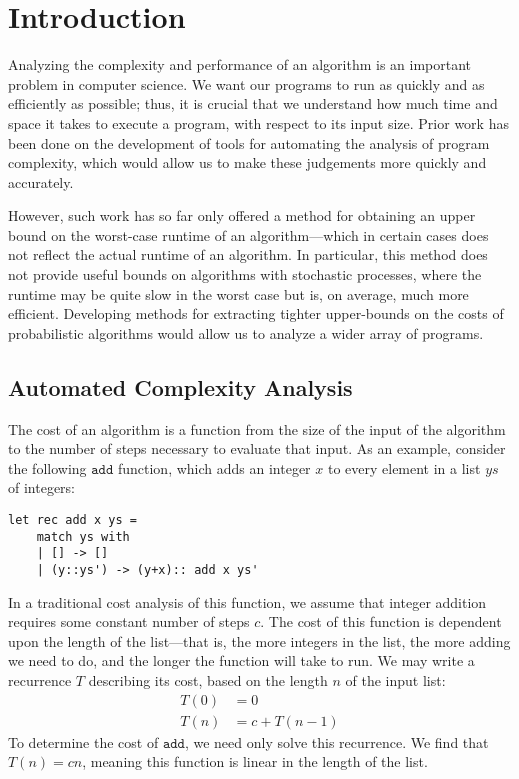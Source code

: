 \chapter{Introduction}
Analyzing the complexity and performance of an algorithm is an important problem in computer science. We want our programs to run as quickly and as efficiently as possible; thus, it is crucial that we understand how much time and space it takes to execute a program, with respect to its input size. Prior work has been done on the development of tools
for automating the analysis of program complexity, which would allow us to make these judgements more quickly and accurately. 

However, such work has so far only offered a method for obtaining an upper bound on the worst-case runtime of an algorithm---which in certain cases does not reflect the actual runtime of an algorithm. In particular, this method does not
provide useful bounds on algorithms with stochastic processes, where the runtime may be quite slow in the worst case but
is, on average, much more efficient. Developing methods for extracting tighter upper-bounds on the costs of probabilistic algorithms would allow us to analyze a wider array of programs.

\section{Automated Complexity Analysis}

The cost of an algorithm is a function from the size of the input of the algorithm to the number of steps necessary to evaluate 
that input. As an example, consider the following $\texttt{add}$ function, which adds an integer $x$ to every element 
in a list $ys$ of integers: \\
\begin{verbatim}
let rec add x ys =
	match ys with
	| [] -> []
	| (y::ys') -> (y+x):: add x ys'
\end{verbatim}
In a traditional cost analysis of this function, we assume that integer addition requires some constant number of steps $c$. The cost of this function is dependent upon the length of the list---that is, the more integers in the list, the more adding we need to
do, and the longer the function will take to run. We may write a recurrence $T$ describing its cost, based on the length
$n$ of the input list:
\begin{align*}
T(0) &= 0 \\
T(n) &= c + T(n-1)
\end{align*}
To determine the cost of $\texttt{add}$, we need only solve this recurrence. We find that $T(n) = cn$, meaning this function
is linear in the length of the list. 

